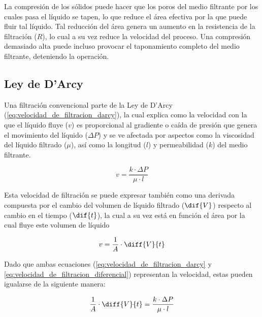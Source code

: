 La compresión de los sólidos puede hacer que los poros del medio filtrante por los cuales pasa el líquido se tapen, lo que reduce el área efectiva por la que puede fluir tal líquido. Tal reducción del área genera un aumento en la resistencia de la filtración ($R$), lo cual a su vez reduce la velocidad del proceso. Una compresión demasiado alta puede incluso provocar el taponamiento completo del medio filtrante, deteniendo la operación.



\subsection{Ley de D'Arcy}


Una filtración convencional parte de la Ley de D'Arcy (\autoref{eq:velocidad_de_filtracion_darcy}), la cual explica como la velocidad con la que el líquido fluye ($v$) es proporcional al gradiente o caída de presión que genera el movimiento del líquido ($\Delta P$) y se ve afectada por aspectos como la viscosidad del líquido filtrado ($\mu$), así como la longitud ($l$) y permeabilidad ($k$) del medio filtrante.

\begin{equation}\label{eq:velocidad_de_filtracion_darcy}
    v = \frac{k \cdot \Delta P}{\mu \cdot l}
\end{equation}

Esta velocidad de filtración se puede expresar también como una derivada compuesta por el cambio del volumen de líquido filtrado ($\dif{V}$) respecto al cambio en el tiempo ($\dif{t}$), la cual a su vez está en función el área por la cual fluye este volumen de líquido

\begin{equation}\label{eq:velocidad_de_filtracion_diferencial}
    v = \frac{1}{A} \cdot \diff{V}{t}
\end{equation}

Dado que ambas ecuaciones (\ref{eq:velocidad_de_filtracion_darcy} y \ref{eq:velocidad_de_filtracion_diferencial}) representan la velocidad, estas pueden igualarse de la siguiente manera:

\begin{equation}\label{eq:ley_de_darcy_kl}
    \frac{1}{A} \cdot \diff{V}{t} = \frac{k \cdot \Delta P}{\mu \cdot l} 
\end{equation} 

